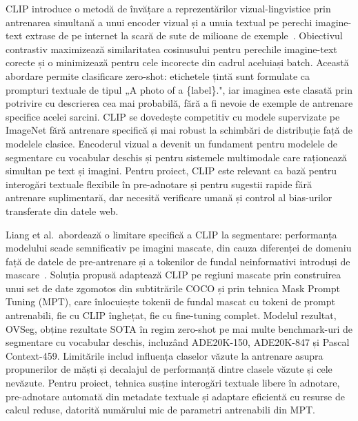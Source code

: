 CLIP introduce o metodă de învățare a reprezentărilor vizual-lingvistice prin antrenarea simultană a unui encoder vizual și a unuia textual pe perechi imagine-text extrase de pe internet la scară de sute de milioane de exemple~\cite{radford2021learningtransferablevisualmodels}. Obiectivul contrastiv maximizează similaritatea cosinusului pentru perechile imagine-text corecte și o minimizează pentru cele incorecte din cadrul aceluiași batch. Această abordare permite clasificare zero-shot: etichetele țintă sunt formulate ca prompturi textuale de tipul „A photo of a \{label\}.", iar imaginea este clasată prin potrivire cu descrierea cea mai probabilă, fără a fi nevoie de exemple de antrenare specifice acelei sarcini. CLIP se dovedește competitiv cu modele supervizate pe ImageNet fără antrenare specifică și mai robust la schimbări de distribuție față de modelele clasice. Encoderul vizual a devenit un fundament pentru modelele de segmentare cu vocabular deschis și pentru sistemele multimodale care raționează simultan pe text și imagini. Pentru proiect, CLIP este relevant ca bază pentru interogări textuale flexibile în pre-adnotare și pentru sugestii rapide fără antrenare suplimentară, dar necesită verificare umană și control al bias-urilor transferate din datele web.

Liang et al.\ abordează o limitare specifică a CLIP la segmentare: performanța modelului scade semnificativ pe imagini mascate, din cauza diferenței de domeniu față de datele de pre-antrenare și a tokenilor de fundal neinformativi introduși de mascare~\cite{liang2023openvocabularysemanticsegmentationmaskadapted}. Soluția propusă adaptează CLIP pe regiuni mascate prin construirea unui set de date zgomotos din subtitrările COCO și prin tehnica Mask Prompt Tuning (MPT), care înlocuiește tokenii de fundal mascat cu tokeni de prompt antrenabili, fie cu CLIP înghețat, fie cu fine-tuning complet. Modelul rezultat, OVSeg, obține rezultate SOTA în regim zero-shot pe mai multe benchmark-uri de segmentare cu vocabular deschis, incluzând ADE20K-150, ADE20K-847 și Pascal Context-459. Limitările includ influența claselor văzute la antrenare asupra propunerilor de măști și decalajul de performanță dintre clasele văzute și cele nevăzute. Pentru proiect, tehnica susține interogări textuale libere în adnotare, pre-adnotare automată din metadate textuale și adaptare eficientă cu resurse de calcul reduse, datorită numărului mic de parametri antrenabili din MPT.

